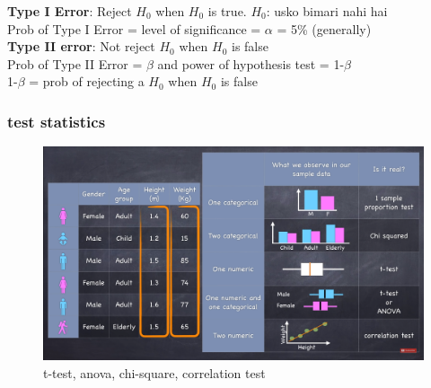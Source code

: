 \documentclass{beamer}
\begin{document}
{%
\begin{frame}[plain]
\vspace{2.5in}
\textbf{Type I Error}: Reject $H_0$ when $H_0$ is true. $H_0$: usko bimari nahi hai \\
Prob of Type I Error = level of significance = $\alpha$ = 5\% (generally)\\
\textbf{Type II error}: Not reject $H_0$ when $H_0$ is false \\
Prob of Type II Error = $\beta$ and power of hypothesis test = 1-$\beta$ \\
1-$\beta$ = prob of rejecting a $H_0$ when $H_0$ is false\\

\end{frame}
}%




\begin{frame}\frametitle{test statistics}%
\begin{figure}
\includegraphics[scale=0.28]{TypesTests} 
\caption{t-test, anova, chi-square, correlation test}
\end{figure}
\end{frame}
\end{document}
